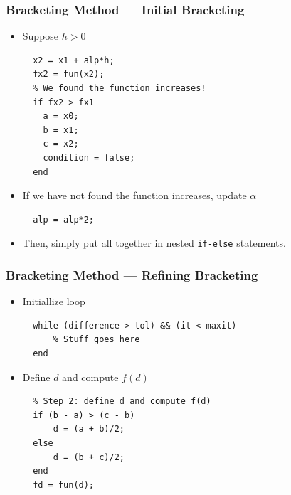 \documentclass[11pt,xcolor={svgnames},aspectratio=169,usepdftitle=false,notheorems]{beamer}
\begin{document}
\begin{frame}[fragile]
  \frametitle{Bracketing Method --- Initial Bracketing}
\begin{itemize}
  \item Suppose $h > 0$
  \begin{lstlisting}
  x2 = x1 + alp*h;
  fx2 = fun(x2);
  % We found the function increases!
  if fx2 > fx1
    a = x0;
    b = x1;
    c = x2;
    condition = false;
  end
  \end{lstlisting}
  \item If we have not found the function increases, update $\alpha$
  \begin{lstlisting}
  alp = alp*2;
  \end{lstlisting}
  \item Then, simply put all together in nested \verb;if-else; statements.
\end{itemize}
\end{frame}

\begin{frame}[fragile]
  \frametitle{Bracketing Method --- Refining Bracketing}
\begin{itemize}
  \item Initiallize loop
  \begin{lstlisting}
  while (difference > tol) && (it < maxit)
      % Stuff goes here
  end
  \end{lstlisting}
  \item Define $d$ and compute $f(d)$
  \begin{lstlisting}
  % Step 2: define d and compute f(d)
  if (b - a) > (c - b)
      d = (a + b)/2;
  else
      d = (b + c)/2;
  end
  fd = fun(d);
  \end{lstlisting}
\end{itemize}
\end{frame}
\end{document}
